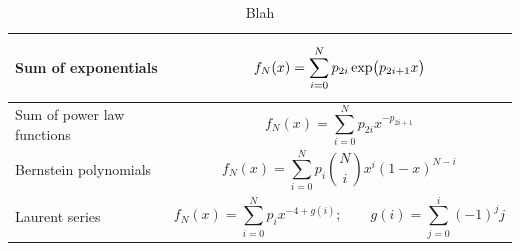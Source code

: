 \begin{table}[htb]
    \caption[Function families considered in the discrete profiling method]{Blah}
    \label{tab:photon_preselection}
    \vspace{.5cm}
    \centering
    \footnotesize
    \renewcommand{\arraystretch}{1}
    \begin{tabular}{m{}|p{}}
       Sum of exponentials & 
       \begin{equation*}
           f_N(x) = \sum^N_{i=0} p_{2i}\,{\rm{exp}}\big( p_{2i+1}x\big)
       \end{equation*} \\ \hline
       Sum of power law functions & 
       \begin{equation*}
           f_N(x) = \sum^N_{i=0} p_{2i}x^{-p_{2i+1}}
       \end{equation*} \\ \hline
       Bernstein polynomials & 
       \begin{equation*}
           f_N(x) = \sum^N_{i=0} p_i {N \choose i}x^i(1-x)^{N-i}
       \end{equation*} \\ \hline
       Laurent series &
       \begin{equation*}
           f_N(x) = \sum^N_{i=0} p_i x^{-4+g(i)}; \qquad g(i) = \sum^i_{j=0} (-1)^jj
       \end{equation*} \\      
    \end{tabular}
\end{table}

